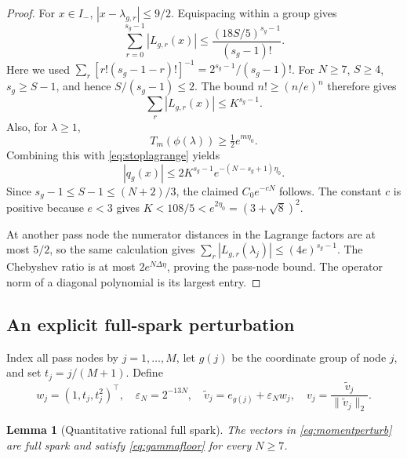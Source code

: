 \documentclass[11pt]{article}
\newtheorem{lemma}[theorem]{Lemma}
\theoremstyle{remark}
\begin{document}
\begin{proof}
For $x\in I_-$, $|x-\lambda_{g,r}|\le9/2$.  Equispacing within a group gives
\[
 \sum_{r=0}^{s_g-1}|L_{g,r}(x)|
 \le \frac{(18S/5)^{s_g-1}}{(s_g-1)!}.
\]
Here we used
$\sum_r[r!(s_g-1-r)!]^{-1}=2^{s_g-1}/(s_g-1)!$.
For $N\ge7$, $S\ge4$, $s_g\ge S-1$, and hence
$S/(s_g-1)\le2$.  The bound $n!\ge(n/e)^n$ therefore gives
\begin{equation}\label{eq:stoplagrange}
 \sum_r|L_{g,r}(x)|\le K^{s_g-1}.
\end{equation}
Also, for $\lambda\ge1$,
\[
 T_m(\phi(\lambda))\ge\tfrac12e^{m\eta_0}.
\]
Combining this with \eqref{eq:stoplagrange} yields
\[
 |q_g(x)|\le2K^{s_g-1}e^{-(N-s_g+1)\eta_0}.
\]
Since $s_g-1\le S-1\le(N+2)/3$, the claimed $C_0e^{-cN}$ follows.
The constant $c$ is positive because $e<3$ gives
$K<108/5<e^{2\eta_0}=(3+\sqrt8)^2$.

At another pass node the numerator distances in the Lagrange factors are at
most $5/2$, so the same calculation gives
$\sum_r|L_{g,r}(\lambda_j)|\le(4e)^{s_g-1}$.
The Chebyshev ratio is at most $2e^{N\Delta\eta}$, proving the pass-node
bound.  The operator norm of a diagonal polynomial is its largest entry.
\end{proof}

\subsection{An explicit full-spark perturbation}

Index all pass nodes by $j=1,\ldots,M$, let $g(j)$ be the coordinate group of
node $j$, and set $t_j=j/(M+1)$.  Define
\begin{equation}\label{eq:momentperturb}
 w_j=(1,t_j,t_j^2)^\top,\quad
 \varepsilon_N=2^{-13N},\quad
 \widetilde v_j=e_{g(j)}+\varepsilon_Nw_j,\quad
 v_j=\frac{\widetilde v_j}{\|\widetilde v_j\|_2}.
\end{equation}

\begin{lemma}[Quantitative rational full spark]\label{lem:fullspark}
The vectors in \eqref{eq:momentperturb} are full spark and satisfy
\eqref{eq:gammafloor} for every $N\ge7$.
\end{lemma}
\end{document}
